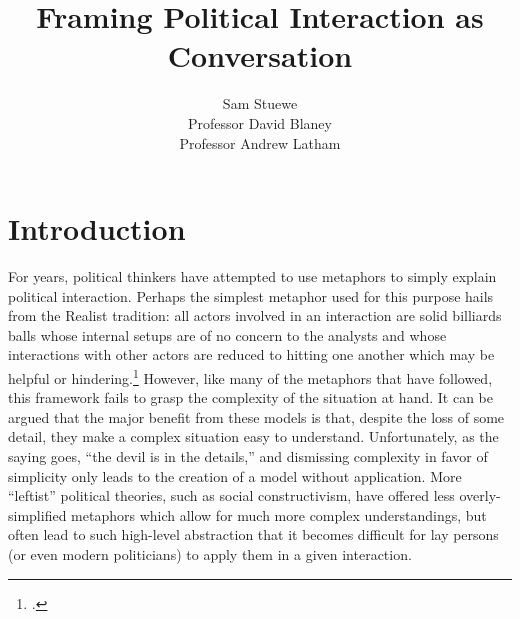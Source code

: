 \documentclass{article}
\begin{document}
\title{Framing Political Interaction as Conversation}
\author{Sam Stuewe\\ Professor David Blaney 
   \\ Professor Andrew Latham}
\maketitle
\thispagestyle{empty}
\newpage
\tableofcontents
\thispagestyle{empty}
\newpage
\setcounter{page}{1}
\section{Introduction}
For years, political thinkers have attempted to use metaphors to simply explain political interaction. 
Perhaps the simplest metaphor used for this purpose hails from the Realist tradition: all actors involved in an interaction are solid billiards balls whose internal setups are of no concern to the analysts and whose interactions with other actors are reduced to hitting one another which may be helpful or hindering.\footcite{mearsheimer01} 
However, like many of the metaphors that have followed, this framework fails to grasp the complexity of the situation at hand. 
It can be argued that the major benefit from these models is that, despite the loss of some detail, they make a complex situation easy to understand. 
Unfortunately, as the saying goes, ``the devil is in the details,'' and dismissing complexity in favor of simplicity only leads to the creation of a model without application. 
More ``leftist'' political theories, such as social constructivism, have offered less overly-simplified metaphors which allow for much more complex understandings, but often lead to such high-level abstraction that it becomes difficult for lay persons (or even modern politicians) to apply them in a given interaction.
\end{document}
